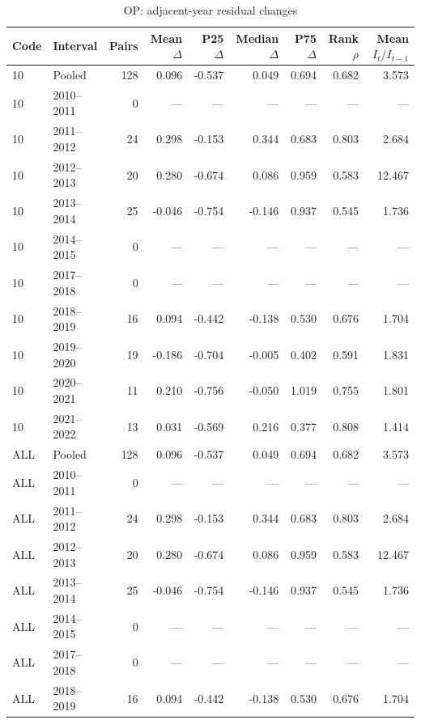 \begin{table}[H]
\centering
\caption{OP: adjacent-year residual changes}
\begingroup\fontsize{9.2}{11.2}\selectfont
\setlength{\tabcolsep}{4.3pt}\renewcommand{\arraystretch}{1.05}
\begin{tabular}{llrrrrrrr}
\toprule
Code & Interval & Pairs & Mean $\Delta$ & P25 $\Delta$ & Median $\Delta$ & P75 $\Delta$ & Rank $\rho$ & \makecell{Mean\\$I_t/I_{t-1}$} \\
\midrule
10 & Pooled & 128 & 0.096 & -0.537 & 0.049 & 0.694 & 0.682 & 3.573 \\
10 & 2010--2011 & 0 & --- & --- & --- & --- & --- & --- \\
10 & 2011--2012 & 24 & 0.298 & -0.153 & 0.344 & 0.683 & 0.803 & 2.684 \\
10 & 2012--2013 & 20 & 0.280 & -0.674 & 0.086 & 0.959 & 0.583 & 12.467 \\
10 & 2013--2014 & 25 & -0.046 & -0.754 & -0.146 & 0.937 & 0.545 & 1.736 \\
10 & 2014--2015 & 0 & --- & --- & --- & --- & --- & --- \\
10 & 2017--2018 & 0 & --- & --- & --- & --- & --- & --- \\
10 & 2018--2019 & 16 & 0.094 & -0.442 & -0.138 & 0.530 & 0.676 & 1.704 \\
10 & 2019--2020 & 19 & -0.186 & -0.704 & -0.005 & 0.402 & 0.591 & 1.831 \\
10 & 2020--2021 & 11 & 0.210 & -0.756 & -0.050 & 1.019 & 0.755 & 1.801 \\
10 & 2021--2022 & 13 & 0.031 & -0.569 & 0.216 & 0.377 & 0.808 & 1.414 \\
ALL & Pooled & 128 & 0.096 & -0.537 & 0.049 & 0.694 & 0.682 & 3.573 \\
ALL & 2010--2011 & 0 & --- & --- & --- & --- & --- & --- \\
ALL & 2011--2012 & 24 & 0.298 & -0.153 & 0.344 & 0.683 & 0.803 & 2.684 \\
ALL & 2012--2013 & 20 & 0.280 & -0.674 & 0.086 & 0.959 & 0.583 & 12.467 \\
ALL & 2013--2014 & 25 & -0.046 & -0.754 & -0.146 & 0.937 & 0.545 & 1.736 \\
ALL & 2014--2015 & 0 & --- & --- & --- & --- & --- & --- \\
ALL & 2017--2018 & 0 & --- & --- & --- & --- & --- & --- \\
ALL & 2018--2019 & 16 & 0.094 & -0.442 & -0.138 & 0.530 & 0.676 & 1.704 \\

\end{tabular}
\end{table}
